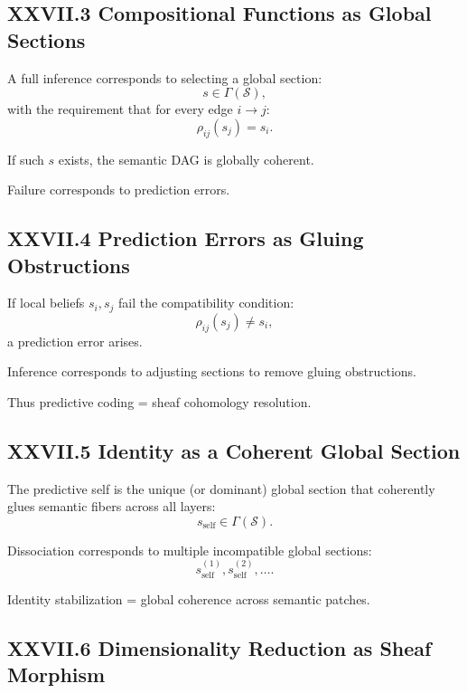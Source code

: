 \documentclass[11pt,letterpaper]{article}
\begin{document}
\subsection{XXVII.3 Compositional Functions as Global Sections}

A full inference corresponds to selecting a global section:
\[
s \in \Gamma(\mathcal{S}),
\]
with the requirement that for every edge $i\to j$:
\[
\rho_{ij}(s_j) = s_i.
\]

If such $s$ exists, the semantic DAG is globally coherent.

Failure corresponds to prediction errors.

\subsection{XXVII.4 Prediction Errors as Gluing Obstructions}

If local beliefs $s_i, s_j$ fail the compatibility condition:
\[
\rho_{ij}(s_j) \ne s_i,
\]
a prediction error arises.

Inference corresponds to adjusting sections to remove gluing obstructions.

Thus predictive coding = sheaf cohomology resolution.

\subsection{XXVII.5 Identity as a Coherent Global Section}

The predictive self is the unique (or dominant) global section that coherently glues semantic fibers across all layers:
\[
s_{\text{self}} \in \Gamma(\mathcal{S}).
\]

Dissociation corresponds to multiple incompatible global sections:
\[
s_{\text{self}}^{(1)}, s_{\text{self}}^{(2)}, \dots.
\]

Identity stabilization = global coherence across semantic patches.

\subsection{XXVII.6 Dimensionality Reduction as Sheaf Morphism}
\end{document}
